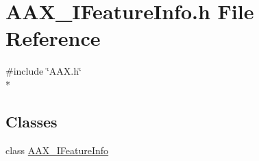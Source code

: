 \hypertarget{a00248}{}\section{A\+A\+X\+\_\+\+I\+Feature\+Info.\+h File Reference}
\label{a00248}
{\ttfamily \#include \char`\"{}A\+A\+X.\+h\char`\"{}}\\*
\subsection*{Classes}
\begin{DoxyCompactItemize}
\item 
class \hyperlink{a00100}{A\+A\+X\+\_\+\+I\+Feature\+Info}
\end{DoxyCompactItemize}
